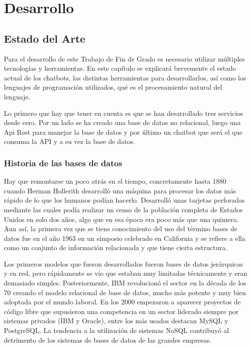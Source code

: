 \chapter{Desarrollo}
\section{Estado del Arte}

Para el desarrollo de este Trabajo de Fin de Grado es necesario utilizar múltiples tecnologías y herramientas. En este capítulo se explicará brevemente el estado actual de los chatbots, las distintas herramientas para desarrollarlos, así como los lenguajes de programación utilizados, qué es el procesamiento natural del lenguaje.

Lo primero que hay que tener en cuenta es que se han desarrollado tres servicios desde cero. Por un lado se ha creado una base de datos no relacional, luego una Api Rest para manejar la base de datos y por último un chatbot que será el que consuma la API y a su vez la base de datos. 


\subsection{Historia de las bases de datos}

Hay que remontarse un poco atrás en el tiempo, concretamente hasta 1880 cuando Herman Hollerith desarrolló una máquina para procesar los datos más rápido de lo que los humanos podían hacerlo. Desarrolló unas tarjetas perforadas mediante las cuales podía realizar un censo de la población completa de Estados Unidos en solo dos años, algo que en esa época era poco más que una quimera. Aun así, la primera vez que se tiene conocimiento del uso del término bases de datos fue en el año 1963 en un simposio celebrado en California y se refiere a ella como un conjunto de información relacionada y que tiene cierta estructura.

Los primeros modelos que fueron desarrollados fueron bases de datos jerárquicas y en red, pero rápidamente se vio que estaban muy limitadas técnicamente y eran demasiado simples. Posteriormente, IBM revolucionó el sector en la década de los 70 creando el modelo relacional de base de datos, mucho más potente y muy bien adoptada por el mundo laboral.
En los 2000 empezaron a aparecer proyectos de código libre que supusieron una competencia en un sector liderado siempre por sistemas privados (IBM y Oracle), entre los más usados destacan MySQL y PostgreSQL. La tendencia a la utilización de sistemas NoSQL contribuyó al detrimento de los sistemas de bases de datos de las grandes empresas. \cite{sanchez2016historia} 

